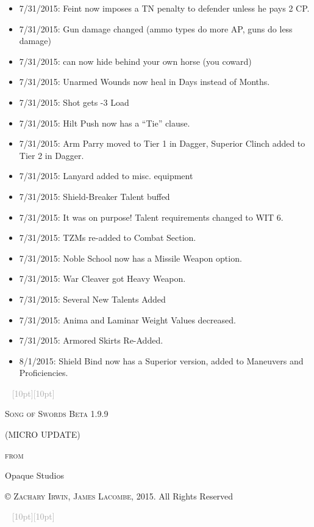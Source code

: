 \documentclass[oneside,11pt,english]{book}
\newcommand{\ornamento}{\vspace{2em}\noindent \textcolor{darkgray}{\hrulefill~ \raisebox{-2.5pt}[10pt][10pt]{\leafright \decofourleft \decothreeleft  \aldineright \decotwo \floweroneleft \decoone   \floweroneright \decotwo \aldineleft\decothreeright \decofourright \leafleft} ~  \hrulefill \\ \vspace{2em}}}
\begin{document}
{\begin{itemize}
\item 7/31/2015: Feint now imposes a TN penalty to defender unless he pays 2 CP. 
\item 7/31/2015: Gun damage changed (ammo types do more AP, guns do less damage) 
\item 7/31/2015: can now hide behind your own horse (you coward) 
\item 7/31/2015: Unarmed Wounds now heal in Days instead of Months. 
\item 7/31/2015: Shot gets -3 Load 
\item 7/31/2015: Hilt Push now has a “Tie” clause. 
\item 7/31/2015: Arm Parry moved to Tier 1 in Dagger, Superior Clinch added to Tier 2 in Dagger. 
\item 7/31/2015: Lanyard added to misc. equipment 
\item 7/31/2015: Shield-Breaker Talent buffed 
\item 7/31/2015: It was on purpose! Talent requirements changed to WIT 6. 
\item 7/31/2015: TZMs re-added to Combat Section. 
\item 7/31/2015: Noble School now has a Missile Weapon option. 
\item 7/31/2015: War Cleaver got Heavy Weapon. 
\item 7/31/2015: Several New Talents Added 
\item 7/31/2015: Anima and Laminar Weight Values decreased. 
\item 7/31/2015: Armored Skirts Re-Added. 
\item 8/1/2015: Shield Bind now has a Superior version, added to Maneuvers and Proficiencies. 
\end{itemize}}
\begin{titlepage}
	\centering
	\ornamento
	\vspace{1.5cm}
	{\scshape\Huge Song of Swords Beta 1.9.9\par}
	\vspace{0.8cm}
	{\scshape\Large{(MICRO UPDATE)}\par \scshape\Large{from} \par}
	\vspace{0.1 cm}
	{\huge Opaque Studios \par}
	\vfill
	\vspace{0.2 cm}
	 \textsc{© Zachary Irwin, James Lacombe}, 2015. All Rights Reserved
	 
	 
	 \ornamento
\end{titlepage}
\newpage
\end{document}
